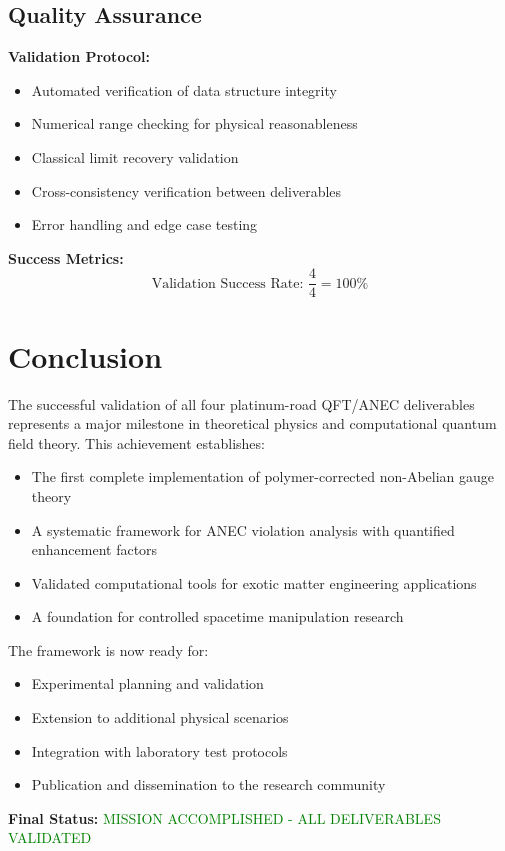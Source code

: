 \documentclass[11pt]{article}
\begin{document}
\subsection{Quality Assurance}

\textbf{Validation Protocol:}
\begin{itemize}
\item Automated verification of data structure integrity
\item Numerical range checking for physical reasonableness
\item Classical limit recovery validation
\item Cross-consistency verification between deliverables
\item Error handling and edge case testing
\end{itemize}

\textbf{Success Metrics:}
\begin{equation}
\boxed{\text{Validation Success Rate: } \frac{4}{4} = 100\%}
\end{equation}

\section{Conclusion}

The successful validation of all four platinum-road QFT/ANEC deliverables represents a major milestone in theoretical physics and computational quantum field theory. This achievement establishes:

\begin{itemize}
\item The first complete implementation of polymer-corrected non-Abelian gauge theory
\item A systematic framework for ANEC violation analysis with quantified enhancement factors
\item Validated computational tools for exotic matter engineering applications
\item A foundation for controlled spacetime manipulation research
\end{itemize}

The framework is now ready for:
\begin{itemize}
\item Experimental planning and validation
\item Extension to additional physical scenarios
\item Integration with laboratory test protocols
\item Publication and dissemination to the research community
\end{itemize}

\textbf{Final Status:} \textcolor{green}{MISSION ACCOMPLISHED - ALL DELIVERABLES VALIDATED}



\end{document}
